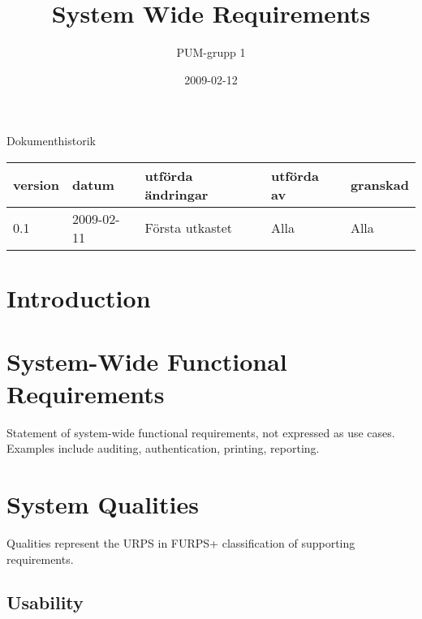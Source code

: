 

\ifpdf
\else
\fi

\title{System Wide Requirements}
\author{PUM-grupp 1}
\date{2009-02-12}



\maketitle\thispagestyle{empty}

\newpage

{\centering \Large{Dokumenthistorik\\}}

\vspace{10pt}
\begin{tabularx}{\textwidth}{ |l|l|X|l|l| }
  \hline
    \textbf{version} & \textbf{datum} & \textbf{utförda ändringar} & \textbf{utförda av} & \textbf{granskad} \\
	\hline 
  0.1 & 2009-02-11 &  Första utkastet  & Alla & Alla   \\
  \hline
\end{tabularx}

\newpage

\setcounter{tocdepth}{2}
\tableofcontents
\newpage

\section{Introduction}

\section{System-Wide Functional Requirements}

Statement of system-wide functional requirements, not expressed as use cases. Examples include auditing, authentication, printing, reporting.

\section{System Qualities}

Qualities represent the URPS in FURPS+ classification of supporting requirements.

\subsection{Usability}

